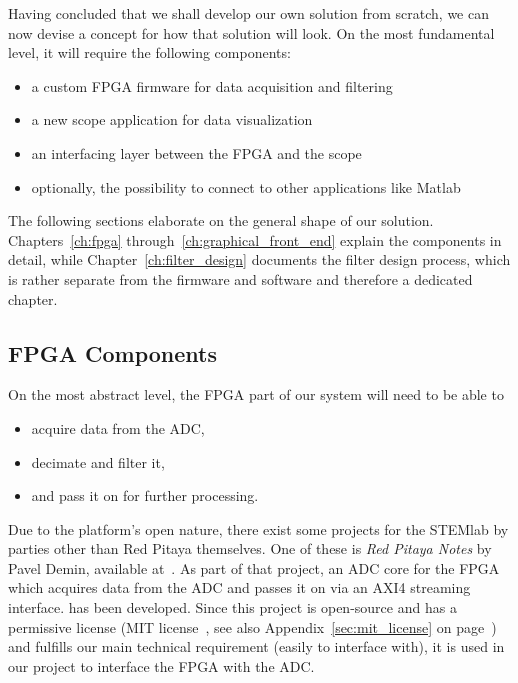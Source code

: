 Having concluded that  we shall develop our own solution  from scratch, we can
now devise a concept for how that solution will look.  On the most fundamental
level, it will require the following components:
\begin{itemize}
    \item
        a custom FPGA firmware for data acquisition and filtering
    \item
        a new scope application for data visualization
    \item
        an interfacing layer between the FPGA and the scope
    \item
        optionally, the possibility to connect to other applications like Matlab
\end{itemize}
The   following   sections   elaborate   on   the   general   shape   of   our
solution. Chapters~\ref{ch:fpga}  through~\ref{ch:graphical_front_end} explain
the components  in detail, while Chapter~\ref{ch:filter_design}  documents the
filter design process, which is rather separate from the firmware and software
and therefore a dedicated chapter.

%
%
\subsection{FPGA Components} %
\label{subsec:concept:fpga_components}

On the most abstract level, the FPGA part of our system will need to be able to
\begin{itemize}\tightlist
    \item
        acquire data from the ADC,
    \item
        decimate and filter it,
    \item
        and pass it on for further processing.
\end{itemize}

Due to the  platform's open nature, there exist some  projects for the STEMlab
by parties other than Red Pitaya  themselves. One of these is \emph{Red Pitaya
Notes} by  Pavel Demin, available  at~\cite{pita:github:pitaya-notes}. As part
of that project, an ADC core for the FPGA which acquires data from the ADC and
passes it on via an AXI4 streaming interface\footnotemark.
 has been developed.
Since  this  project  is  open-source   and  has  a  permissive  license  (MIT
license~\cite{licenses:mit},   see   also  Appendix~\ref{sec:mit_license}   on
page~\pageref{sec:mit_license})  and fulfills  our main  technical requirement
(easily to interface  with), it is used  in our project to  interface the FPGA
with the ADC.

